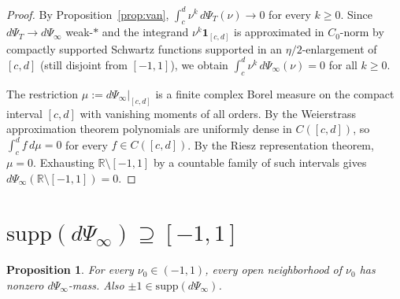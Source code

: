\documentclass[11pt]{article}
\newtheorem{proposition}[theorem]{Proposition}
\theoremstyle{definition}
\theoremstyle{remark}
\begin{document}
\begin{proof}
By Proposition~\ref{prop:van}, $\int_c^d\nu^k\,d\Psi_T(\nu)\to 0$ for
every $k\ge 0$.  Since $d\Psi_T\to d\Psi_\infty$ weak-$*$ and the
integrand $\nu^k\mathbf{1}_{[c,d]}$ is approximated in $C_0$-norm by
compactly supported Schwartz functions supported in an
$\eta/2$-enlargement of $[c,d]$ (still disjoint from $[-1,1]$), we
obtain $\int_c^d\nu^k\,d\Psi_\infty(\nu)=0$ for all $k\ge 0$.

The restriction $\mu:=d\Psi_\infty|_{[c,d]}$ is a finite complex Borel
measure on the compact interval $[c,d]$ with vanishing moments of all
orders.  By the Weierstrass approximation theorem polynomials are
uniformly dense in $C([c,d])$, so $\int_c^d f\,d\mu=0$ for every
$f\in C([c,d])$.  By the Riesz representation theorem, $\mu=0$.
Exhausting $\mathbb{R}\setminus[-1,1]$ by a countable family of such
intervals gives $d\Psi_\infty(\mathbb{R}\setminus[-1,1])=0$.
\end{proof}

\section{$\mathrm{supp}(d\Psi_\infty)\supseteq[-1,1]$}

\begin{proposition}\label{prop:sharp}
For every $\nu_0\in(-1,1)$, every open neighborhood of $\nu_0$ has
nonzero $d\Psi_\infty$-mass.  Also $\pm1\in\mathrm{supp}(d\Psi_\infty)$.
\end{proposition}
\end{document}
